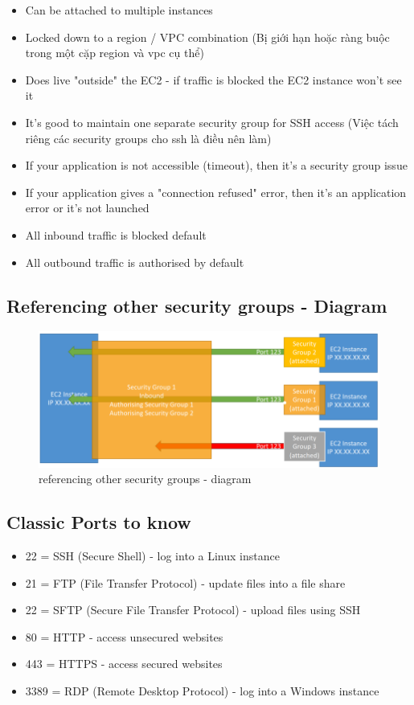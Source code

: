 \begin{itemize}
	\item Can be attached to multiple instances
	\item Locked down to a region / VPC combination (Bị giới hạn hoặc ràng buộc trong một cặp region và vpc cụ thể)
	\item Does live "outside" the EC2 - if traffic is blocked the EC2 instance won't see it
	\item It's good to maintain one separate security group for SSH access (Việc tách riêng các security groups cho ssh là điều nên làm)
	\item If your application is not accessible (timeout), then it's a security group issue
	\item If your application gives a "connection refused" error, then it's an application error or it's not launched
	\item All inbound traffic is blocked default
	\item All outbound traffic is authorised by default
\end{itemize}



\subsection{Referencing other security groups - Diagram}

\begin{figure}[htbp]
	\centering
	\includegraphics[width=1\linewidth]{images/referencing other security groups - diagram.png}
	\caption{referencing other security groups - diagram}
	\label{fig:referencing other security groups - diagram}
\end{figure}

\subsection{Classic Ports to know}

\begin{itemize}
	\item 22 = SSH (Secure Shell) - log into a Linux instance
	\item 21 = FTP (File Transfer Protocol) - update files into a file share
	\item 22 = SFTP (Secure File Transfer Protocol) - upload files using SSH
	\item 80 = HTTP - access unsecured websites
	\item 443 = HTTPS - access secured websites
	\item 3389 = RDP (Remote Desktop Protocol) - log into a Windows instance
\end{itemize}

